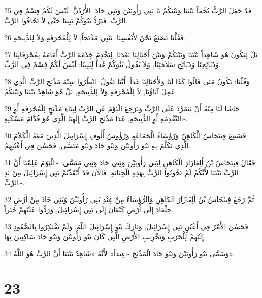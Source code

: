 \par 25 قَدْ جَعَلَ الرَّبُّ تُخُماً بَيْنَنَا وَبَيْنَكُمْ يَا بَنِي رَأُوبَيْنَ وَبَنِي جَادَ. الأُرْدُنُّ. لَيْسَ لَكُمْ قِسْمٌ فِي الرَّبِّ. فَيَرُدُّ بَنُوكُمْ بَنِينَا حَتَّى لاَ يَخَافُوا الرَّبَّ.
\par 26 فَقُلْنَا نَصْنَعُ نَحْنُ لأَنْفُسِنَا. نَبْنِي مَذْبَحاً, لاَ لِلْمُحْرَقَةِ وَلاَ لِلذَّبِيحَةِ,
\par 27 بَلْ لِيَكُونَ هُوَ شَاهِداً بَيْنَنَا وَبَيْنَكُمْ وَبَيْنَ أَجْيَالِنَا بَعْدَنَا, لِنَخْدِمَ خِدْمَةَ الرَّبِّ أَمَامَهُ بِمُحْرَقَاتِنَا وَذَبَائِحِنَا وَذَبَائِحِ سَلاَمَتِنَا, وَلاَ يَقُولُ بَنُوكُمْ غَداً لِبَنِينَا: لَيْسَ لَكُمْ قِسْمٌ فِي الرَّبِّ.
\par 28 وَقُلْنَا: يَكُونُ مَتَى قَالُوا كَذَا لَنَا وَلأَجْيَالِنَا غَداً, أَنَّنَا نَقُولُ: انْظُرُوا شِبْهَ مَذْبَحِ الرَّبِّ الَّذِي عَمِلَ آبَاؤُنَا, لاَ لِلْمُحْرَقَةِ وَلاَ لِلذَّبِيحَةِ, بَلْ هُوَ شَاهِدٌ بَيْنَنَا وَبَيْنَكُمْ.
\par 29 حَاشَا لَنَا مِنْهُ أَنْ نَتَمَرَّدَ عَلَى الرَّبِّ وَنَرْجِعَ الْيَوْمَ عَنِ الرَّبِّ لِبِنَاءِ مَذْبَحٍ لِلْمُحْرَقَةِ أَوِ التَّقْدِمَةِ أَوِ الذَّبِيحَةِ, عَدَا مَذْبَحِ الرَّبِّ إِلَهِنَا الَّذِي هُوَ قُدَّامَ مَسْكَنِهِ».
\par 30 فَسَمِعَ فِينَحَاسُ الْكَاهِنُ وَرُؤَسَاءُ الْجَمَاعَةِ وَرُؤُوسُ أُلُوفِ إِسْرَائِيلَ الَّذِينَ مَعَهُ الْكَلاَمَ الَّذِي تَكَلَّمَ بِهِ بَنُو رَأُوبَيْنَ وَبَنُو جَادَ وَبَنُو مَنَسَّى, فَحَسُنَ فِي أَعْيُنِهِمْ.
\par 31 فَقَالَ فِينَحَاسُ بْنُ أَلِعَازَارَ الْكَاهِنِ لِبَنِي رَأُوبَيْنَ وَبَنِي جَادَ وَبَنِي مَنَسَّى: «الْيَوْمَ عَلِمْنَا أَنَّ الرَّبَّ بَيْنَنَا لأَنَّكُمْ لَمْ تَخُونُوا الرَّبَّ بِهَذِهِ الْخِيَانَةِ. فَالآنَ قَدْ أَنْقَذْتُمْ بَنِي إِسْرَائِيلَ مِنْ يَدِ الرَّبِّ».
\par 32 ثُمَّ رَجَعَ فِينَحَاسُ بْنُ أَلِعَازَارَ الكَاهِنِ وَالرُّؤَسَاءُ مِنْ عِنْدِ بَنِي رَأُوبَيْنَ وَبَنِي جَادَ مِنْ أَرْضِ جِلْعَادَ إِلَى أَرْضِ كَنْعَانَ إِلَى بَنِي إِسْرَائِيلَ, وَرَدُّوا عَلَيْهِمْ خَبَراً.
\par 33 فَحَسُنَ الأَمْرُ فِي أَعْيُنِ بَنِي إِسْرَائِيلَ, وَبَارَكَ بَنُو إِسْرَائِيلَ اللّهَ, وَلَمْ يَفْتَكِرُوا بِالصُّعُودِ إِلَيْهِمْ لِلْحَرْبِ وَتَخْرِيبِ الأَرْضِ الَّتِي كَانَ بَنُو رَأُوبَيْنَ وَبَنُو جَادَ سَاكِنِينَ بِهَا.
\par 34 وَسَمَّى بَنُو رَأُوبَيْنَ وَبَنُو جَادَ الْمَذْبَحَ «عِيداً» لأَنَّهُ «شَاهِدٌ بَيْنَنَا أَنَّ الرَّبَّ هُوَ اللَّهُ».

\chapter{23}

